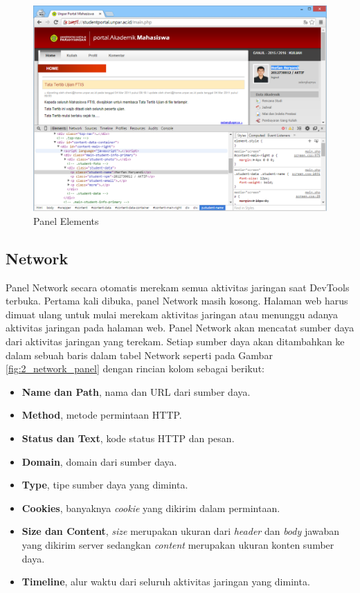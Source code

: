 \begin{figure}[H]
	\centering
	\includegraphics[scale=0.5]{Gambar/elements-panel}
	\caption{Panel Elements} 
	\label{fig:2_elements_panel}
\end{figure}

\subsection{Network}
Panel Network secara otomatis merekam semua aktivitas jaringan saat DevTools terbuka. Pertama kali dibuka, panel Network masih kosong. Halaman web harus dimuat ulang untuk mulai merekam aktivitas jaringan atau menunggu adanya aktivitas jaringan pada halaman web. Panel Network akan mencatat sumber daya dari aktivitas jaringan yang terekam. Setiap sumber daya akan ditambahkan ke dalam sebuah baris dalam tabel Network seperti pada Gambar \ref{fig:2_network_panel} dengan rincian kolom sebagai berikut:
\begin{itemize}
	\item \textbf{Name dan Path}, nama dan URL dari sumber daya.
	\item \textbf{Method}, metode permintaan HTTP.
	\item \textbf{Status dan Text}, kode status HTTP dan pesan.
	\item \textbf{Domain}, domain dari sumber daya.
	\item \textbf{Type}, tipe sumber daya yang diminta.
	\item \textbf{Cookies}, banyaknya \textit{cookie} yang dikirim dalam permintaan.
	\item \textbf{Size dan Content}, \textit{size} merupakan ukuran dari \textit{header} dan \textit{body} jawaban yang dikirim server sedangkan \textit{content} merupakan ukuran konten sumber daya.
	\item \textbf{Timeline}, alur waktu dari seluruh aktivitas jaringan yang diminta.
\end{itemize}


